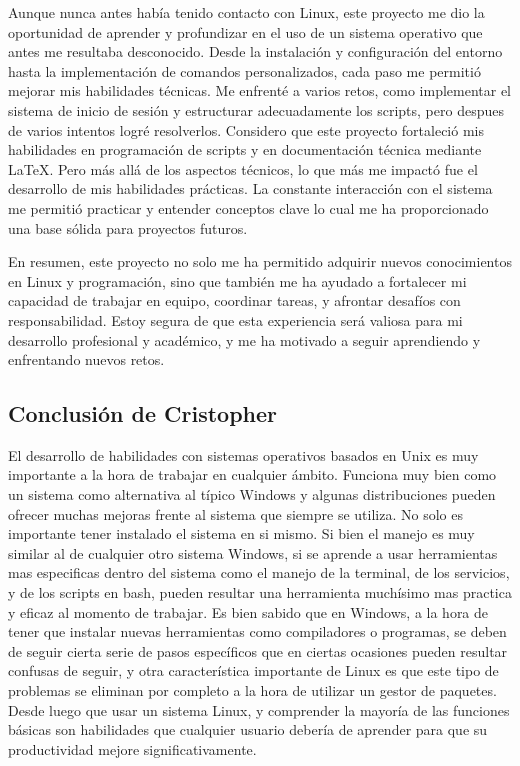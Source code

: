 \documentclass{article}
\begin{document}
Aunque nunca antes había tenido contacto con Linux, este proyecto me dio la oportunidad de aprender y profundizar en el uso de un sistema operativo que antes me resultaba desconocido. Desde la instalación y configuración del entorno hasta la implementación de comandos personalizados, cada paso me permitió mejorar mis habilidades técnicas. Me enfrenté a varios retos, como implementar el sistema de inicio de sesión y estructurar adecuadamente los scripts, pero despues de varios intentos logré resolverlos. Considero que este proyecto fortaleció mis habilidades en programación de scripts y en documentación técnica mediante LaTeX. Pero más allá de los aspectos técnicos, lo que más me impactó fue el desarrollo de mis habilidades prácticas. La constante interacción con el sistema me permitió practicar y entender conceptos clave lo cual me ha proporcionado una base sólida para proyectos futuros.

En resumen, este proyecto no solo me ha permitido adquirir nuevos conocimientos en Linux y programación, sino que también me ha ayudado a fortalecer mi capacidad de trabajar en equipo, coordinar tareas, y afrontar desafíos con responsabilidad. Estoy segura de que esta experiencia será valiosa para mi desarrollo profesional y académico, y me ha motivado a seguir aprendiendo y enfrentando nuevos retos.

\subsection{Conclusión de Cristopher}

El desarrollo de habilidades con sistemas operativos basados en Unix es muy importante a la
hora de trabajar en cualquier ámbito. Funciona muy bien como un sistema como alternativa al
típico Windows y algunas distribuciones pueden ofrecer muchas mejoras frente al sistema que
siempre se utiliza.
No solo es importante tener instalado el sistema en si mismo. Si bien el manejo es muy similar
al de cualquier otro sistema Windows, si se aprende a usar herramientas mas especificas
dentro del sistema como el manejo de la terminal, de los servicios, y de los scripts en bash,
pueden resultar una herramienta muchísimo mas practica y eficaz al momento de trabajar.
Es bien sabido que en Windows, a la hora de tener que instalar nuevas herramientas como
compiladores o programas, se deben de seguir cierta serie de pasos específicos que en ciertas
ocasiones pueden resultar confusas de seguir, y otra característica importante de Linux es que
este tipo de problemas se eliminan por completo a la hora de utilizar un gestor de paquetes.
Desde luego que usar un sistema Linux, y comprender la mayoría de las funciones básicas son
habilidades que cualquier usuario debería de aprender para que su productividad mejore
significativamente.
\end{document}
